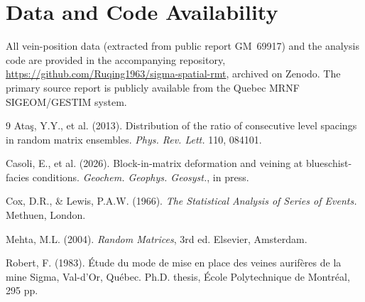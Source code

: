 \documentclass[11pt]{article}
\begin{document}
\section*{Data and Code Availability}
All vein-position data (extracted from public report GM~69917) and the analysis
code are provided in the accompanying repository,
\url{https://github.com/Ruqing1963/sigma-spatial-rmt}, archived on Zenodo. The
primary source report is publicly available from the Quebec MRNF SIGEOM/GESTIM
system.

\begin{thebibliography}{9}
Ata\c{s}, Y.Y., et al. (2013).
Distribution of the ratio of consecutive level spacings in random matrix
ensembles. \emph{Phys. Rev. Lett.} 110, 084101.

Casoli, E., et al. (2026).
Block-in-matrix deformation and veining at blueschist-facies conditions.
\emph{Geochem. Geophys. Geosyst.}, in press.

Cox, D.R., \& Lewis, P.A.W. (1966).
\emph{The Statistical Analysis of Series of Events.} Methuen, London.

Mehta, M.L. (2004). \emph{Random Matrices}, 3rd ed. Elsevier, Amsterdam.

Robert, F. (1983).
\'Etude du mode de mise en place des veines aurif\`eres de la mine Sigma,
Val-d'Or, Qu\'ebec. Ph.D. thesis, \'Ecole Polytechnique de Montr\'eal, 295 pp.
\end{thebibliography}
\end{document}
